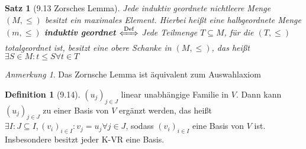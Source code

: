 \documentclass[a4paper]{scrartcl}
\DeclareMathOperator{\Exists}{\exists}
\DeclareMathOperator{\Forall}{\forall}
\theoremstyle{definition}
\newtheorem{defn}{Definition}
\theoremstyle{plain}
\newtheorem{thm}{Satz}
\theoremstyle{plain}
\theoremstyle{remark}
\theoremstyle{remark}
\newtheorem{note}{Anmerkung}
\theoremstyle{remark}
\theoremstyle{remark}
\theoremstyle{remark}
\begin{document}
\begin{thm}[9.13 Zorsches Lemma]
Jede induktiv geordnete nichtleere Menge $(M, \leq)$ besitzt ein maximales Element.
Hierbei heißt eine halbgeordnete Menge $(m, \leq)$ \textbf{induktiv geordnet} $\xLeftrightarrow{\text{Def}}$ Jede Teilmenge $T\subseteq M$, für die $(T, \leq)$ totalgeordnet ist,
besitzt eine obere Schanke in $(M, \leq)$, das heißt $\Exists S\in M: t\leq S \Forall t\in T$
\end{thm}
\begin{note}
Das Zornsche Lemma ist äquivalent zum Auswahlaxiom
\end{note}
\begin{defn}[9.14]
$(u_j)_{j\in J}$ linear unabhängige Familie in $V$. Dann kann $(u_j)_{j \in J}$ zu einer
Basis von $V$ ergänzt werden, das heißt $\Exists I: J\subseteq I, (v_i)_{i\in I}: v_j = u_j \Forall j\in J$, sodass $(v_i)_{i\in I}$  eine Basis von $V$ ist.
Insbesondere besitzt jeder K-VR eine Basis.
\end{defn}
\end{document}

